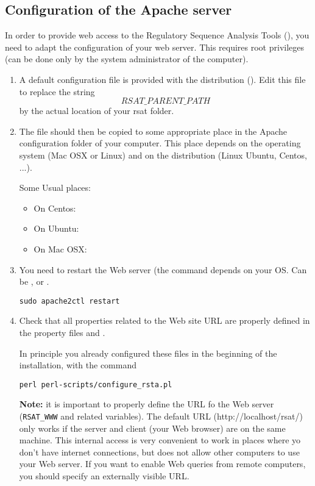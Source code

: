 \subsection{Configuration of the Apache server}

In order to provide web access to the Regulatory Sequence Analysis
Tools (\RSAT), you need to adapt the configuration of your web
server. This requires root privileges (can be done only by the system
administrator of the computer).


\begin{enumerate}
\item A default configuration file is provided with the \RSAT
  distribution (). Edit this file to
  replace the string \texttt{\[RSAT\_PARENT\_PATH\]} by the actual
  location of your rsat folder.
  
\item The file should then be copied to some appropriate place in the
  Apache configuration folder of your computer. This place depends on
  the operating system (Mac OSX or Linux) and on the distribution
  (Linux Ubuntu, Centos, ...).
  
  Some Usual places:
  \begin{itemize}
  \item On Centos: 
  \item On Ubuntu: 
  \item On Mac OSX: 
  \end{itemize}
  
\item You need to restart the Web server (the command depends on your
  OS. Can be ,  or
  .

  \begin{lstlisting}
sudo apache2ctl restart
  \end{lstlisting}

\item Check that all properties related to the Web site URL are
  properly defined in the \RSAT property files
   and
  . 

  In principle you already configured these files in the beginning of
  the installation, with the command
  \begin{lstlisting}
perl perl-scripts/configure_rsta.pl
  \end{lstlisting}

  \textbf{Note:} it is important to properly define the URL fo the Web
  server (\texttt{RSAT\_WWW} and related variables). The default URL
  (http://localhost/rsat/) only works if the server and client (your
  Web browser) are on the same machine. This internal access is very
  convenient to work in places where yo don't have internet
  connections, but does not allow other computers to use your Web
  server.  If you want to enable Web queries from remote computers,
  you should specify an externally visible URL.

\end{enumerate}

